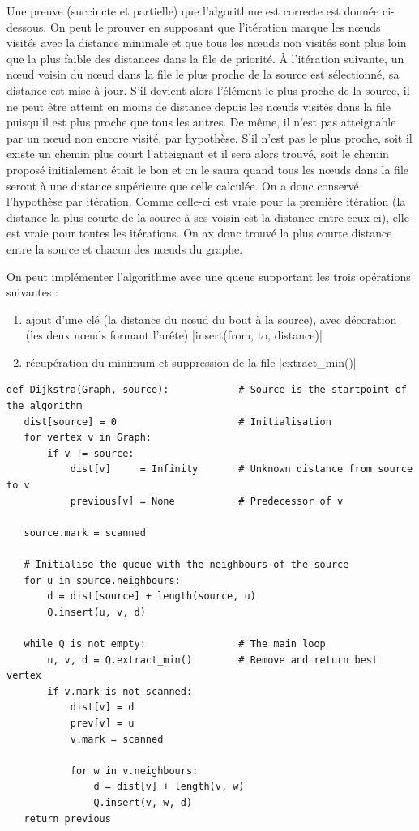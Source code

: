 \documentclass{article}
\begin{document}
Une preuve (succincte et partielle) que l'algorithme est correcte est
donnée ci-dessous. On peut le prouver en supposant que
l'itération marque les nœuds visités avec la distance minimale et que
tous les nœuds non visités sont plus loin que la plus faible des
distances dans la file de priorité.
À l'itération suivante, un nœud voisin du nœud dans la file le plus
proche de la source est sélectionné, sa distance est mise à jour. S'il
devient alors l'élément le plus proche de la source, il ne peut être
atteint en moins de distance depuis les nœuds visités dans la file
puisqu'il est plus proche que tous les autres. De même, il n'est pas
atteignable par un nœud non encore visité, par hypothèse. S'il n'est
pas le plus proche, soit il existe un chemin plus court l'atteignant
et il sera alors trouvé, soit le chemin proposé initialement était le
bon et on le saura quand tous les nœuds dans la file seront à une
distance supérieure que celle calculée. On a donc conservé l'hypothèse
par itération.
Comme celle-ci est vraie pour la première itération (la distance la
plus courte de la source à ses voisin est la distance entre ceux-ci),
elle est vraie pour toutes les itérations. On ax donc trouvé la plus
courte distance entre la source et chacun des nœuds du graphe.

On peut implémenter l'algorithme avec une queue supportant les trois
opérations suivantes :
\begin{enumerate}
  \item ajout d'une clé (la distance du nœud du bout à la source), avec
    décoration (les deux nœuds formant l'arête)
    |insert(from, to, distance)|
  \item récupération du minimum et suppression de la file
    |extract_min()|
\end{enumerate}
\begin{verbatim}
def Dijkstra(Graph, source):            # Source is the startpoint of the algorithm
   dist[source] = 0                     # Initialisation
   for vertex v in Graph:
       if v != source:
           dist[v]     = Infinity       # Unknown distance from source to v
           previous[v] = None           # Predecessor of v

   source.mark = scanned

   # Initialise the queue with the neighbours of the source
   for u in source.neighbours:
       d = dist[source] + length(source, u)
       Q.insert(u, v, d)

   while Q is not empty:                # The main loop
       u, v, d = Q.extract_min()        # Remove and return best vertex
       if v.mark is not scanned:
           dist[v] = d
           prev[v] = u
           v.mark = scanned

           for w in v.neighbours:
               d = dist[v] + length(v, w)
               Q.insert(v, w, d)
   return previous
\end{verbatim}
\end{document}

